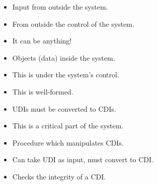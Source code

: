 \begin{frame}
  \begin{definition}
    \begin{itemize}
      \item Input from outside the system.
      \item From outside the control of the system.
      \item It can be anything!
    \end{itemize}
  \end{definition}

  \pause{}

  \begin{definition}
    \begin{itemize}
      \item Objects (data) inside the system.
      \item This is under the system's control.
      \item This is well-formed.
    \end{itemize}
  \end{definition}
\end{frame}

\begin{frame}
  \begin{remark}
    \begin{itemize}
      \item UDIs must be converted to CDIs.
      \item This is a critical part of the system.
    \end{itemize}
  \end{remark}
\end{frame}

\begin{frame}
  \begin{definition}
    \begin{itemize}
      \item Procedure which manipulates CDIs.
      \item Can take UDI as input, must convert to CDI.
    \end{itemize}
  \end{definition}

  \pause{}

  \begin{definition}
    \begin{itemize}
      \item Checks the integrity of a CDI.
    \end{itemize}
  \end{definition}
\end{frame}

